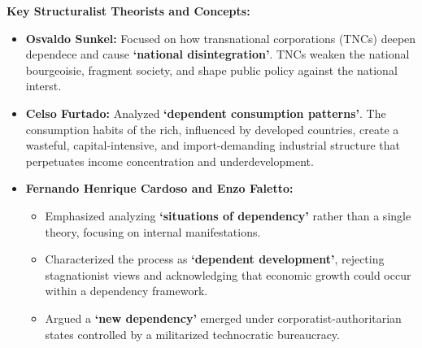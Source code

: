 \documentclass{article}
\begin{document}
    \noindent \textbf{Key Structuralist Theorists and Concepts:}
    \begin{itemize}
        \item \textbf{Osvaldo Sunkel:} Focused on how transnational
        corporations (TNCs) deepen dependece and cause
        \textbf{`national disintegration'}. TNCs weaken the national
        bourgeoisie, fragment society, and shape public policy against the
        national interst.
        \item \textbf{Celso Furtado:} Analyzed
        \textbf{`dependent consumption patterns'}. The consumption habits of
        the rich, influenced by developed countries, create a wasteful,
        capital-intensive, and import-demanding industrial structure that
        perpetuates income concentration and underdevelopment.
        \item \textbf{Fernando Henrique Cardoso and Enzo Faletto:}
        \begin{itemize}
            \item Emphasized analyzing \textbf{`situations of dependency'}
            rather than a single theory, focusing on internal manifestations.
            \item Characterized the process as
            \textbf{`dependent development'}, rejecting stagnationist views
            and acknowledging that economic growth could occur within a
            dependency framework.
            \item Argued a \textbf{`new dependency'} emerged under
            corporatist-authoritarian states controlled by a militarized
            technocratic bureaucracy.
        \end{itemize}
    \end{itemize}
\end{document}
